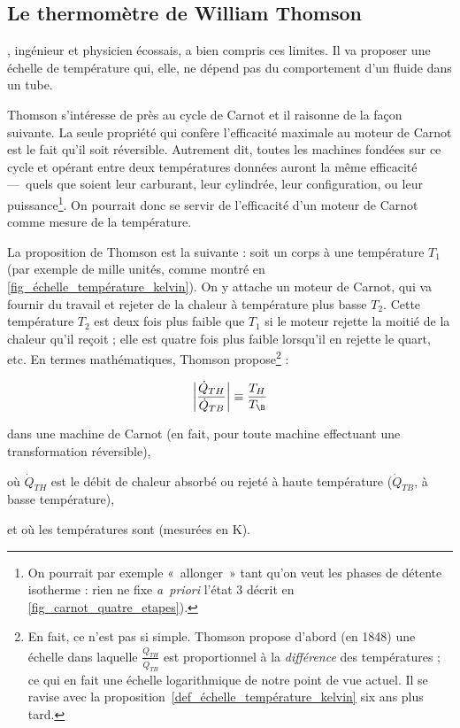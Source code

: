 	\subsection{Le thermomètre de William Thomson}
	
		, ingénieur et physicien écossais, a bien compris ces limites. Il va proposer une échelle de température qui, elle, ne dépend pas du comportement d’un fluide dans un tube.

		Thomson s’intéresse de près au cycle de Carnot et il raisonne de la façon suivante. La seule propriété qui confère l’efficacité maximale au moteur de Carnot est le fait qu’il soit réversible. Autrement dit, toutes les machines fondées sur ce cycle et opérant entre deux températures données auront la même efficacité —\ quels que soient leur carburant, leur cylindrée, leur configuration, ou leur puissance\footnote{On pourrait par exemple «~allonger~» tant qu’on veut les phases de détente isotherme : rien ne fixe \textit{a~priori} l’état 3 décrit en \cref{fig_carnot_quatre_etapes}).}. On pourrait donc se servir de l’efficacité d’un moteur de Carnot comme mesure de la température.
		
		La proposition de Thomson est la suivante : soit un corps à une température $T_1$ (par exemple de mille unités, comme montré en \cref{fig_échelle_température_kelvin}). On y attache un moteur de Carnot, qui va fournir du travail et rejeter de la chaleur à température plus basse $T_2$. Cette température $T_2$ est deux fois plus faible que $T_1$ si le moteur rejette la moitié de la chaleur qu’il reçoit ; elle est quatre fois plus faible lorsqu’il en rejette le quart, etc. En termes mathématiques, Thomson propose\footnote{En fait, ce n’est pas si simple. Thomson propose d’abord (en 1848) une échelle dans laquelle $\frac{\dot{Q}_{TH}}{\dot{Q}_{TB}}$ est proportionnel à la \emph{différence} des températures ; ce qui en fait une échelle logarithmique de notre point de vue actuel. Il se ravise avec la proposition~\ref{def_échelle_température_kelvin} six ans plus tard.} :
			
		\begin{equation}
			\left| \frac{\dot{Q}_{TH}}{\dot{Q}_{TB}} \right| \equiv  \frac{T_H}{T_\B }
			\label{def_échelle_température_kelvin}
		\end{equation}

		\begin{equationterms}
			\item dans une machine de Carnot (en fait, pour toute machine effectuant une transformation réversible),
			\item où \tab $\dot{Q}_{TH}$ \tab est le débit de chaleur absorbé ou rejeté à haute température ($\dot{Q}_{TB}$, à basse température),
			\item et où les températures sont  (mesurées en \si{\kelvin}).
		\end{equationterms}

